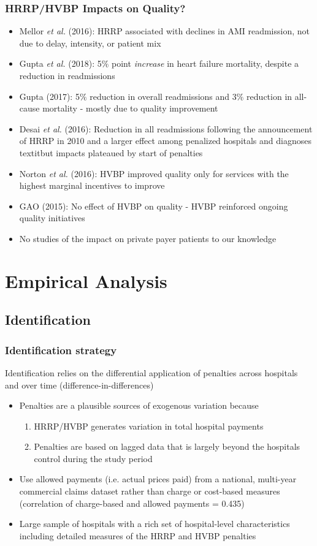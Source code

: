 \documentclass{beamer}
\begin{document}
\begin{frame}
\frametitle{HRRP/HVBP Impacts on Quality?}
\begin{itemize}
\item Mellor \textit{et al.} (2016): HRRP associated with declines in AMI readmission, not due to delay, intensity, or patient mix
\item Gupta \textit{et al.} (2018): 5$\%$ point \textit{increase} in heart failure mortality, despite a reduction in readmissions
\item Gupta (2017): 5$\%$ reduction in overall readmissions and 3$\%$ reduction in all-cause mortality - mostly due to quality improvement
\item Desai \textit{et al.} (2016): Reduction in all readmissions following the announcement of HRRP in 2010 and a larger effect among penalized hospitals and diagnoses textit{but} impacts plateaued by start of penalties
\item Norton \textit{et al.} (2016): HVBP improved quality only for services with the highest marginal incentives to improve
\item GAO (2015): No effect of HVBP on quality - HVBP reinforced ongoing quality initiatives
\item No studies of the impact on private payer patients to our knowledge
\end{itemize}
\end{frame}


\section{Empirical Analysis}
\subsection{Identification}

\begin{frame}
\frametitle{Identification strategy}
Identification relies on the differential application of penalties across hospitals and over time (difference-in-differences)
\begin{itemize}
\item Penalties are a plausible sources of exogenous variation because
\begin{enumerate}
\item HRRP/HVBP generates variation in total hospital payments 
\item Penalties are based on lagged data that is largely beyond the hospitals control during the study period 
\end{enumerate} 
\item Use allowed payments (i.e. actual prices paid) from a national, multi-year commercial claims dataset rather than charge or cost-based measures (correlation of charge-based and allowed payments = 0.435)
\item Large sample of hospitals with a rich set of hospital-level characteristics including detailed measures of the HRRP and HVBP penalties
\end{itemize}
\end{frame}
\end{document}
